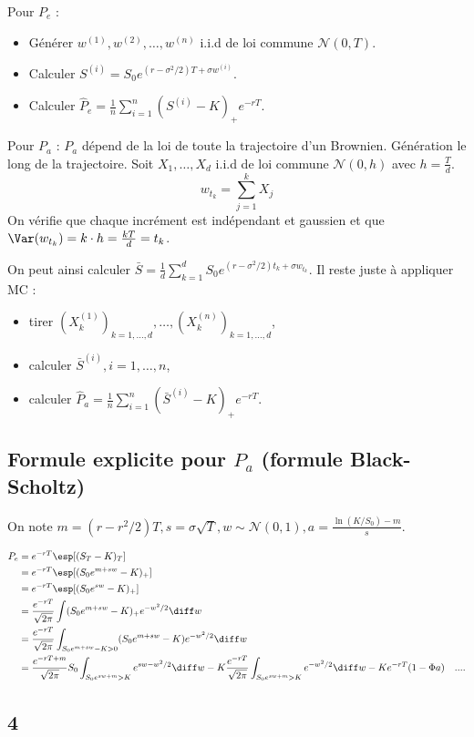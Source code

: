 	Pour $P_e$ :
	\begin{itemize}
		\item[\textbullet] Générer $w^{(1)}, w^{(2)}, \ldots, w^{(n)}$ i.i.d de loi commune $\mathcal{N}(0,T)$.
		\item[\textbullet] Calculer $S^{(i)} = S_0 e^{(r - \sigma^2/2)T + \sigma w^{(i)}}$.
		\item[\textbullet] Calculer $\hat{P}_e = \frac{1}{n} \sum_{i = 1}^n \left( S^{(i)} - K \right)_+ e^{-rT}$.\\
	\end{itemize}
	
	Pour $P_a$ : $P_a$ dépend de la loi de toute la trajectoire d'un Brownien.
	Génération le long de la trajectoire.
	Soit $X_1,\ldots,X_d$ i.i.d de loi commune $\mathcal{N}(0,h)$ avec $h = \frac{T}{d}$.
	$$w_{t_k} = \sum_{j = 1}^k X_j$$
	On vérifie que chaque incrément est indépendant et gaussien et que $\Var(w_{t_k}) = k \cdot h = \frac{kT}{d} = t_k$.
	
	On peut ainsi calculer $\bar{S} = \frac{1}{d} \sum_{k = 1}^d S_0 e^{(r - \sigma^2/2)t_k + \sigma w_{t_k}}$.
	Il reste juste à appliquer MC :
	\begin{itemize}
		\item[\textbullet] tirer $(X_k^{(1)})_{k = 1,\ldots,d}, \ldots, (X_k^{(n)})_{k = 1,\ldots,d}$,
		\item[\textbullet] calculer $\bar{S}^{(i)}, i = 1,\ldots,n$,
		\item[\textbullet] calculer $\hat{P}_a = \frac{1}{n} \sum_{i = 1}^n \left( \bar{S}^{(i)} - K \right)_+ e^{-rT}$.
	\end{itemize}


\subsection{Formule explicite pour $P_a$ (formule Black-Scholtz)}

	On note $m = (r - r^2/2)T, s = \sigma \sqrt{T}, w \sim \mathcal{N}(0,1), a = \frac{\ln(K/S_0) - m}{s}$.

	\begin{align*}
	P_e & = e^{-rT} \esp[(S_T - K)_T] \\
	    & = e^{-rT} \esp[(S_0 e^{m + sw} - K)_+] \\
	    & = e^{-rT} \esp[(S_0 e^{sw} - K)_+] \\
	    & = \frac{e^{-rT}}{\sqrt{2\pi}} \int (S_0 e^{m + sw} - K)_+ e^{-w^2/2} \diff w \\
	    & = \frac{e^{-rT}}{\sqrt{2\pi}} \int_{S_0 e^{m + sw} - K > 0} (S_0 e^{m + sw} - K) e^{-w^2/2} \diff w \\
	    & = \frac{e^{-rT + m}}{\sqrt{2\pi}} S_0 \int_{S_0 e^{sw + m} > K} e^{sw - w^2/2} \diff w - K \frac{e^{-rT}}{\sqrt{2\pi}} \int_{S_0 e^{sw + m} > K} e^{-w^2/2} \diff w - K e^{-rT} ( 1 - \Phi a )
	    & ....
	\end{align*}
	
\subsection{4}

	